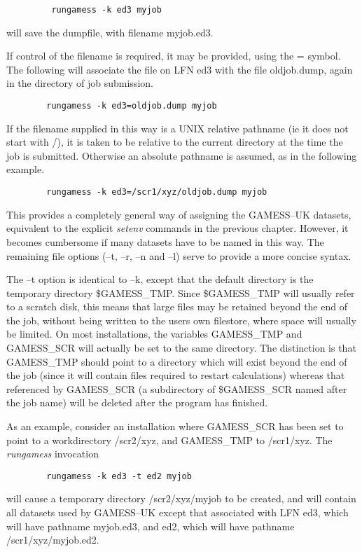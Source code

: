 \documentclass[11pt,fleqn]{article}
\begin{document}
{
\footnotesize
\begin{verbatim}
         rungamess -k ed3 myjob
\end{verbatim}
}
will save the dumpfile, with filename myjob.ed3.

If control of the filename is required, it
may be provided, using the = symbol. The following will associate the file on LFN
ed3 with the file oldjob.dump, again in the directory of job submission.

{
\footnotesize
\begin{verbatim}
        rungamess -k ed3=oldjob.dump myjob
\end{verbatim}
}
If the filename supplied in this way is a UNIX relative pathname (ie
it does not start with /), it is taken to be relative to the current
directory at the time the job is submitted. Otherwise an 
absolute pathname is assumed, as in the following example.

{
\footnotesize
\begin{verbatim}
        rungamess -k ed3=/scr1/xyz/oldjob.dump myjob
\end{verbatim}
}
This provides a completely general way of assigning the GAMESS--UK datasets,
equivalent to the explicit {\em  setenv} commands in the previous chapter.
However, it becomes cumbersome if many datasets have to be named in this way.
The remaining file options (--t, --r, --n and --l) serve
to provide a more concise syntax.

The --t option is identical to --k, except that
the default directory is the temporary directory \$GAMESS\_TMP.
Since \$GAMESS\_TMP will usually refer to a scratch disk, this means that
large files may be retained beyond the end of the job, without being written to
the users own filestore, where space will usually be limited. On most
installations, the variables GAMESS\_TMP and  GAMESS\_SCR will actually be
set to the same directory. The distinction is that GAMESS\_TMP should
point to a directory which will exist beyond the end of the job (since it will
contain files required to restart calculations) whereas that referenced
by GAMESS\_SCR (a subdirectory of \$GAMESS\_SCR named after the job name)
will be deleted after the program has finished. 

As an example, consider an installation where GAMESS\_SCR has been 
set to point to 
a workdirectory /scr2/xyz, and GAMESS\_TMP to /scr1/xyz.
The {\em rungamess} invocation

{
\footnotesize
\begin{verbatim}
        rungamess -k ed3 -t ed2 myjob
\end{verbatim}
}
will cause a temporary directory /scr2/xyz/myjob to be created, 
and will contain all 
datasets used by GAMESS--UK except that associated with LFN ed3, 
which will have pathname myjob.ed3,
and ed2, which will have pathname /scr1/xyz/myjob.ed2. 
\end{document}
